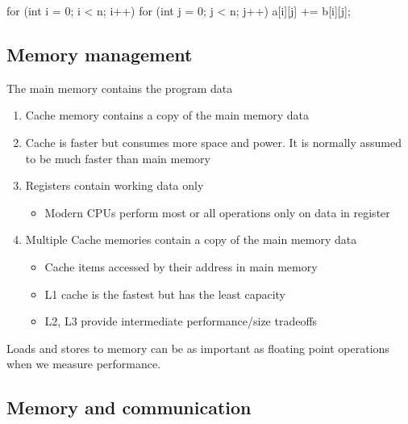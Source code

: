 \documentclass[%
oneside,                 %
final,                   %
10pt]{article}
\begin{document}
\bcppcod
  for (int i = 0; i < n; i++) {
      for (int j = 0; j < n; j++) {
           a[i][j] += b[i][j];
      }  
  }

\ecppcod


\subsection{Memory management}
The main memory contains the program data
\begin{enumerate}
\item Cache memory contains a copy of the main memory data

\item Cache is faster but consumes more space and power. It is normally assumed to be much faster than main memory

\item Registers contain working data only
\begin{itemize}

 \item Modern CPUs perform most or all operations only on data in register

\end{itemize}

\noindent
\item Multiple Cache memories contain a copy of the main memory data
\begin{itemize}

 \item Cache items accessed by their address in main memory

 \item L1 cache is the fastest but has the least capacity

 \item L2, L3 provide intermediate performance/size tradeoffs
\end{itemize}

\noindent
\end{enumerate}

\noindent
Loads and stores to memory can be as important as floating point operations when we measure performance.

\subsection{Memory and communication}
\end{document}
